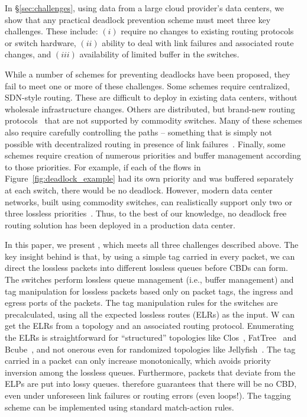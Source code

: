 In \S\ref{sec:challenges}, using data from a large cloud provider's data
centers, we show that any practical deadlock prevention scheme must meet three
key challenges. These include: $(i)$ require no changes to existing routing
protocols or switch hardware, $(ii)$ ability to deal with link failures and
associated  route changes, and $(iii)$ availability of limited buffer in
the switches.

While a number of schemes for preventing deadlocks have been proposed, they fail
to meet one or more of these challenges.  Some schemes require centralized,
SDN-style routing.  These are difficult to deploy in existing data centers,
without wholesale infrastructure changes.  Others are distributed, but brand-new
routing protocols~\cite{tcpbolt} that are not supported by commodity switches.
Many of these schemes also require carefully controlling the paths -- something
that is simply not possible with decentralized routing in presence of link
failures~\cite{netpilot}.  Finally, some schemes require creation of numerous
priorities and buffer management according to those priorities. For example, if
each of the flows in Figure~\ref{fig:deadlock_example} had its own priority and
was buffered separately at each switch, there would be no deadlock.  However,
modern data center networks, built using commodity switches, can realistically
support only two or three lossless priorities~\cite{rdmaatscale}.
Thus, to the best of our knowledge, no deadlock free routing solution has been
deployed in a production data center.  


In this paper, we present \sysname{}, which meets all three challenges described 
above. The key insight behind \sysname{} is that, by using a simple tag carried 
in every packet, we can direct the lossless packets into different lossless queues 
before CBDs can form. The switches perform lossless queue management (i.e., 
buffer management) and tag manipulation for lossless packets based only on packet tags, 
the ingress and egress ports of the packets. The tag manipulation rules for the 
switches are precalculated, using all the expected lossless routes (ELRs) as the input. 
W can get the ELRs from a topology and an associated routing protocol. Enumerating 
the ELRs is straightforward for ``structured'' topologies like Clos~\cite{clos}, 
FatTree~\cite{fattree} and Bcube~\cite{bcube}, and not onerous even for randomized 
topologies like Jellyfish~\cite{jellyfish}.  The tag carried in a packet can only
increase monotonically, which avoids priority inversion among the lossless queues.
Furthermore, packets that deviate from the ELPs are put into lossy queues. 
\sysname{} therefore guarantees that there will be no CBD, even under
unforeseen link failures or routing errors (even loops!).  
The tagging scheme can be implemented using standard match-action rules.

